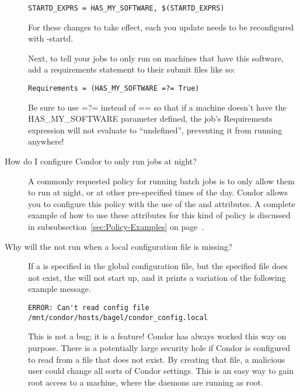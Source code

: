 \begin{description}
\begin{verbatim}STARTD_EXPRS = HAS_MY_SOFTWARE, $(STARTD_EXPRS)\end{verbatim}

\Note For these changes to take effect, each  you update
needs to be reconfigured with  -startd.

Next, to tell your jobs to only run on machines that have this
software, add a requirements statement to their submit files like so:

\begin{verbatim}Requirements = (HAS_MY_SOFTWARE =?= True)\end{verbatim}

\Note Be sure to use =?= instead of == so that if a machine doesn't have
the HAS\_MY\_SOFTWARE parameter defined, the job's Requirements
expression will not evaluate to ``undefined'', preventing it from
running anywhere!


\item[How do I configure Condor to only run jobs at night?]

A commonly requested policy for running batch jobs is to only allow
them to run at night, or at other pre-specified times of the day.
Condor allows you to configure this policy with the use of the
 and   attributes.  
A complete example of how to use these attributes for this kind of
policy is discussed in subsubsection~\ref{sec:Policy-Examples} on
page~\pageref{sec:Policy-Examples}.


\item[Why will the \Condor{master} not run when a local configuration file is missing?]

If a  
is specified in the global configuration file,
but the specified file does not exist,
the  will not start up, and it prints a variation
of the following example message.

\begin{verbatim}
ERROR: Can't read config file /mnt/condor/hosts/bagel/condor_config.local
\end{verbatim}

This is not a bug; it is a feature!
Condor has always worked this way on purpose.
There is a potentially
large security hole if Condor is configured to read from a file that
does not exist.
By creating that file, a malicious user could
change all sorts of Condor settings.
This is an easy way
to gain root access to a machine,
where the daemons are running as root.


\end{description}
